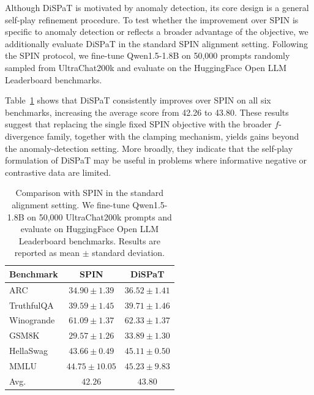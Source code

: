 Although DiSPaT is motivated by anomaly detection, its core design is a general self-play refinement procedure. To test whether the improvement over SPIN is specific to anomaly detection or reflects a broader advantage of the objective, we additionally evaluate DiSPaT in the standard SPIN alignment setting. Following the SPIN protocol, we fine-tune Qwen1.5-1.8B on 50{,}000 prompts randomly sampled from UltraChat200k and evaluate on the HuggingFace Open LLM Leaderboard benchmarks.

Table~\ref{tab:spin_alignment} shows that DiSPaT consistently improves over SPIN on all six benchmarks, increasing the average score from 42.26 to 43.80. These results suggest that replacing the single fixed SPIN objective with the broader $f$-divergence family, together with the clamping mechanism, yields gains beyond the anomaly-detection setting. More broadly, they indicate that the self-play formulation of DiSPaT may be useful in problems where informative negative or contrastive data are limited.

\begin{table}[t]
\centering
\caption{Comparison with SPIN in the standard alignment setting. We fine-tune Qwen1.5-1.8B on 50{,}000 UltraChat200k prompts and evaluate on HuggingFace Open LLM Leaderboard benchmarks. Results are reported as mean $\pm$ standard deviation.}
\label{tab:spin_alignment}
\footnotesize
\renewcommand{\arraystretch}{1.08}
\begin{tabular*}{\columnwidth}{@{\extracolsep{\fill}}lcc@{}}
\toprule
\textbf{Benchmark} & \textbf{SPIN} & \textbf{DiSPaT} \\
\midrule
ARC & $34.90 \pm 1.39$ & $\mathbf{36.52 \pm 1.41}$ \\
TruthfulQA & $39.59 \pm 1.45$ & $\mathbf{39.71 \pm 1.46}$ \\
Winogrande & $61.09 \pm 1.37$ & $\mathbf{62.33 \pm 1.37}$ \\
GSM8K & $29.57 \pm 1.26$ & $\mathbf{33.89 \pm 1.30}$ \\
HellaSwag & $43.66 \pm 0.49$ & $\mathbf{45.11 \pm 0.50}$ \\
MMLU & $44.75 \pm 10.05$ & $\mathbf{45.23 \pm 9.83}$ \\
Avg. & $42.26$ & $\mathbf{43.80}$ \\
\bottomrule
\end{tabular*}
\end{table}
